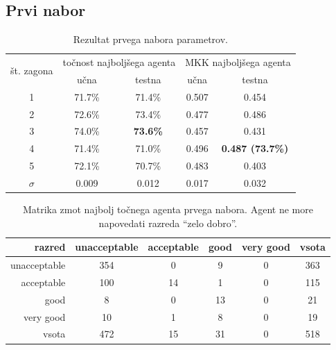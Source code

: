 \subsection{Prvi nabor}\label{subsec:dodatek-car-prvi-nabor}
\begin{table}[H]
    \begin{center}
        \begin{tabular}{|| c | c c || c c ||}
            \hline
            \multirow{2}{*}{št. zagona} & \multicolumn{2}{c||}{točnost najboljšega agenta} & \multicolumn{2}{c||}{MKK najboljšega agenta} \\ \cline{2-5}
            & učna   & testna          & učna  & testna                  \\
            \hline
            1        & 71.7\% & 71.4\%          & 0.507 & 0.454                   \\
            \hline
            2        & 72.6\% & 73.4\%          & 0.477 & 0.486                   \\
            \hline
            3        & 74.0\% & \textbf{73.6\%} & 0.457 & 0.431                   \\
            \hline
            4        & 71.4\% & 71.0\%          & 0.496 & \textbf{0.487 (73.7\%)} \\
            \hline
            5        & 72.1\% & 70.7\%          & 0.483 & 0.403                   \\
            \hline
            $\sigma$ & 0.009  & 0.012           & 0.017 & 0.032                   \\
            \hline
        \end{tabular}
    \end{center}
    \caption{Rezultat prvega nabora parametrov.}
    \label{tab:car_result_1}
\end{table}

\begin{table}[H]
    \centering
    \begin{tabular}{||rccccc||}
        \hline
        razred       & unacceptable & acceptable & good & very good & vsota \\ \hline
        unacceptable & 354          & 0          & 9    & 0         & 363   \\ \hline
        acceptable   & 100          & 14         & 1    & 0         & 115   \\ \hline
        good         & 8            & 0          & 13   & 0         & 21    \\ \hline
        very good    & 10           & 1          & 8    & 0         & 19    \\ \hline
        vsota        & 472          & 15         & 31   & 0         & 518   \\ \hline
    \end{tabular}
    \caption{Matrika zmot najbolj točnega agenta prvega nabora. Agent ne more napovedati razreda \enquote{zelo dobro}.}
    \label{tab:car_acc_1}
\end{table}

